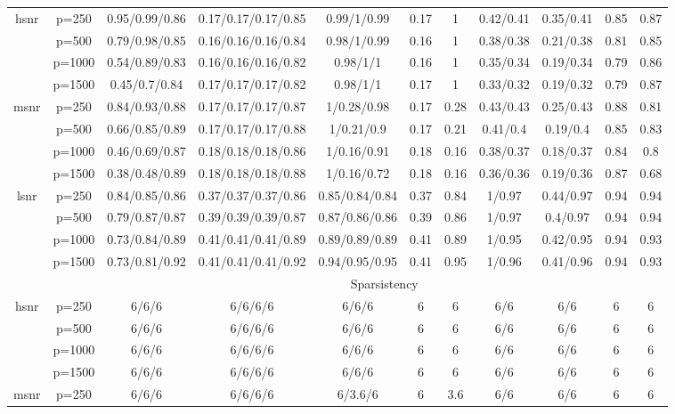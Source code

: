 \begin{table}[ht]
{\begin{tabular}{|c|c|ccccccccc|}
\midrule\multirow{4}[2]{*}{hsnr} & p=250 & 0.95/0.99/0.86 & 0.17/0.17/0.17/0.85 & 0.99/1/0.99 & 0.17 & 1 & 0.42/0.41 & 0.35/0.41 & 0.85 & 0.87 \\ 
   & p=500 & 0.79/0.98/0.85 & 0.16/0.16/0.16/0.84 & 0.98/1/0.99 & 0.16 & 1 & 0.38/0.38 & 0.21/0.38 & 0.81 & 0.85 \\ 
   & p=1000 & 0.54/0.89/0.83 & 0.16/0.16/0.16/0.82 & 0.98/1/1 & 0.16 & 1 & 0.35/0.34 & 0.19/0.34 & 0.79 & 0.86 \\ 
   & p=1500 & 0.45/0.7/0.84 & 0.17/0.17/0.17/0.82 & 0.98/1/1 & 0.17 & 1 & 0.33/0.32 & 0.19/0.32 & 0.79 & 0.87 \\ 
  \midrule\multirow{4}[2]{*}{msnr} & p=250 & 0.84/0.93/0.88 & 0.17/0.17/0.17/0.87 & 1/0.28/0.98 & 0.17 & 0.28 & 0.43/0.43 & 0.25/0.43 & 0.88 & 0.81 \\ 
   & p=500 & 0.66/0.85/0.89 & 0.17/0.17/0.17/0.88 & 1/0.21/0.9 & 0.17 & 0.21 & 0.41/0.4 & 0.19/0.4 & 0.85 & 0.83 \\ 
   & p=1000 & 0.46/0.69/0.87 & 0.18/0.18/0.18/0.86 & 1/0.16/0.91 & 0.18 & 0.16 & 0.38/0.37 & 0.18/0.37 & 0.84 & 0.8 \\ 
   & p=1500 & 0.38/0.48/0.89 & 0.18/0.18/0.18/0.88 & 1/0.16/0.72 & 0.18 & 0.16 & 0.36/0.36 & 0.19/0.36 & 0.87 & 0.68 \\ 
  \midrule\multirow{4}[2]{*}{lsnr} & p=250 & 0.84/0.85/0.86 & 0.37/0.37/0.37/0.86 & 0.85/0.84/0.84 & 0.37 & 0.84 & 1/0.97 & 0.44/0.97 & 0.94 & 0.94 \\ 
   & p=500 & 0.79/0.87/0.87 & 0.39/0.39/0.39/0.87 & 0.87/0.86/0.86 & 0.39 & 0.86 & 1/0.97 & 0.4/0.97 & 0.94 & 0.94 \\ 
   & p=1000 & 0.73/0.84/0.89 & 0.41/0.41/0.41/0.89 & 0.89/0.89/0.89 & 0.41 & 0.89 & 1/0.95 & 0.42/0.95 & 0.94 & 0.93 \\ 
   & p=1500 & 0.73/0.81/0.92 & 0.41/0.41/0.41/0.92 & 0.94/0.95/0.95 & 0.41 & 0.95 & 1/0.96 & 0.41/0.96 & 0.94 & 0.93 \\ 
   \midrule 
 \multicolumn{1}{|c}{} &       & \multicolumn{9}{c|}{Sparsistency} \\
\midrule\multirow{4}[2]{*}{hsnr} & p=250 & 6/6/6 & 6/6/6/6 & 6/6/6 & 6 & 6 & 6/6 & 6/6 & 6 & 6 \\ 
   & p=500 & 6/6/6 & 6/6/6/6 & 6/6/6 & 6 & 6 & 6/6 & 6/6 & 6 & 6 \\ 
   & p=1000 & 6/6/6 & 6/6/6/6 & 6/6/6 & 6 & 6 & 6/6 & 6/6 & 6 & 6 \\ 
   & p=1500 & 6/6/6 & 6/6/6/6 & 6/6/6 & 6 & 6 & 6/6 & 6/6 & 6 & 6 \\ 
  \midrule\multirow{4}[2]{*}{msnr} & p=250 & 6/6/6 & 6/6/6/6 & 6/3.6/6 & 6 & 3.6 & 6/6 & 6/6 & 6 & 6 \\ 

\end{tabular}}
\end{table}
